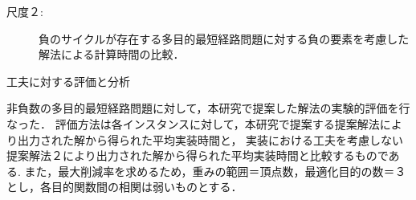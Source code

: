 \documentclass[12pt]{optlab-bachelor}
\begin{document}
\begin{description}
  \item[尺度２:]
  負のサイクルが存在する多目的最短経路問題に対する負の要素を考慮した解法による計算時間の比較．


\end{description}

\begin{description}
  \item[工夫に対する評価と分析]
\end{description}

非負数の多目的最短経路問題に対して，本研究で提案した解法の実験的評価を行なった．
評価方法は各インスタンスに対して，本研究で提案する提案解法により出力された解から得られた平均実装時間と，
実装における工夫を考慮しない提案解法２により出力された解から得られた平均実装時間と比較するものである.
また，最大削減率を求めるため，重みの範囲＝頂点数，最適化目的の数＝３とし，各目的関数間の相関は弱いものとする．
\end{document}
